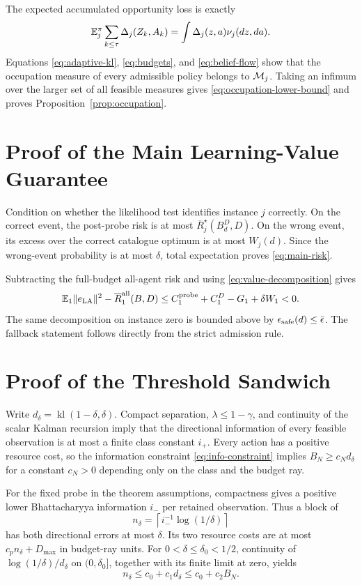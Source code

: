 The expected accumulated opportunity loss is exactly
\begin{equation}
\mathbb{E}_j^\pi\sum_{k\le\tau}\Delta_j(Z_k,A_k)
=\int\Delta_j(z,a)\nu_j(dz,da).
\end{equation}
Equations \eqref{eq:adaptive-kl}, \eqref{eq:budgets}, and \eqref{eq:belief-flow} show that the occupation measure of every admissible policy belongs to ${\cal M}_j$.
Taking an infimum over the larger set of all feasible measures gives \eqref{eq:occupation-lower-bound} and proves Proposition~\ref{prop:occupation}.

\section{Proof of the Main Learning-Value Guarantee}
Condition on whether the likelihood test identifies instance $j$ correctly.
On the correct event, the post-probe risk is at most $\overline R_j^\star(B_d^D,D)$.
On the wrong event, its excess over the correct catalogue optimum is at most $W_j(d)$.
Since the wrong-event probability is at most $\delta$, total expectation proves \eqref{eq:main-risk}.

Subtracting the full-budget all-agent risk and using \eqref{eq:value-decomposition} gives
\begin{equation}
\mathbb{E}_1\|e_{\rm LA}\|^2-\overline R_1^{\rm all}(B,D)
\le C_1^{\rm probe}+C_1^D-G_1+\delta W_1<0.
\end{equation}
The same decomposition on instance zero is bounded above by $\epsilon_{\rm safe}(d)\le\bar\epsilon$.
The fallback statement follows directly from the strict admission rule.

\section{Proof of the Threshold Sandwich}
Write $d_\delta=\operatorname{kl}(1-\delta,\delta)$.
Compact separation, $\lambda\le1-\gamma$, and continuity of the scalar Kalman recursion imply that the directional information of every feasible observation is at most a finite class constant $i_+$.
Every action has a positive resource cost, so the information constraint \eqref{eq:info-constraint} implies $B_N\ge c_Nd_\delta$ for a constant $c_N>0$ depending only on the class and the budget ray.

For the fixed probe in the theorem assumptions, compactness gives a positive lower Bhattacharyya information $i_-$ per retained observation.
Thus a block of
\begin{equation}
n_\delta=\left\lceil i_-^{-1}\log(1/\delta)\right\rceil
\end{equation}
has both directional errors at most $\delta$.
Its two resource costs are at most $c_pn_\delta+D_{\max}$ in budget-ray units.
For $0<\delta\le\delta_0<1/2$, continuity of $\log(1/\delta)/d_\delta$ on $(0,\delta_0]$, together with its finite limit at zero, yields
\begin{equation}
n_\delta\le c_0+c_1d_\delta\le c_0+c_2B_N.
\label{eq:probe-versus-necessary}
\end{equation}

